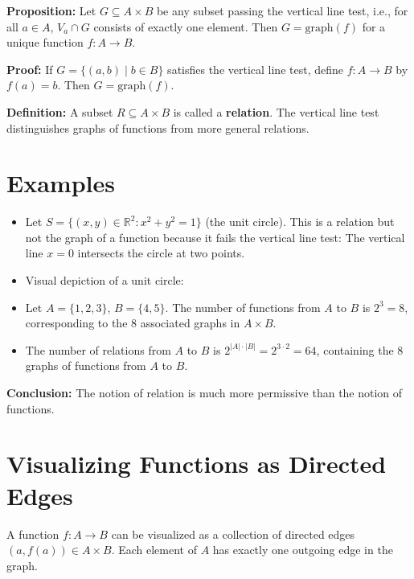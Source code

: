 \documentclass{article}
\begin{document}
\textbf{Proposition:} Let $G \subseteq A \times B$ be any subset passing the vertical line test, i.e., for all $a \in A$, $V_a \cap G$ consists of exactly one element. Then $G = \text{graph}(f)$ for a unique function $f: A \to B$.

\textbf{Proof:} If $G = \{(a, b) \mid b \in B\}$ satisfies the vertical line test, define $f: A \to B$ by $f(a) = b$. Then $G = \text{graph}(f)$.

\textbf{Definition:} A subset $R \subseteq A \times B$ is called a \textbf{relation}. The vertical line test distinguishes graphs of functions from more general relations.

\section*{Examples}
\begin{itemize}
    \item Let $S = \{(x, y) \in \mathbb{R}^2 : x^2 + y^2 = 1\}$ (the unit circle). This is a relation but not the graph of a function because it fails the vertical line test: The vertical line $x = 0$ intersects the circle at two points.
    \item Visual depiction of a unit circle:
    \begin{center}
    \end{center}
    \item Let $A = \{1, 2, 3\}$, $B = \{4, 5\}$. The number of functions from $A$ to $B$ is $2^3 = 8$, corresponding to the $8$ associated graphs in $A \times B$.
    \item The number of relations from $A$ to $B$ is $2^{|A| \cdot |B|} = 2^{3 \cdot 2} = 64$, containing the $8$ graphs of functions from $A$ to $B$.
\end{itemize}

\textbf{Conclusion:} The notion of relation is much more permissive than the notion of functions.

\section*{Visualizing Functions as Directed Edges}
A function $f: A \to B$ can be visualized as a collection of directed edges $(a, f(a)) \in A \times B$. Each element of $A$ has exactly one outgoing edge in the graph.

\begin{center}
\end{center}
\end{document}

